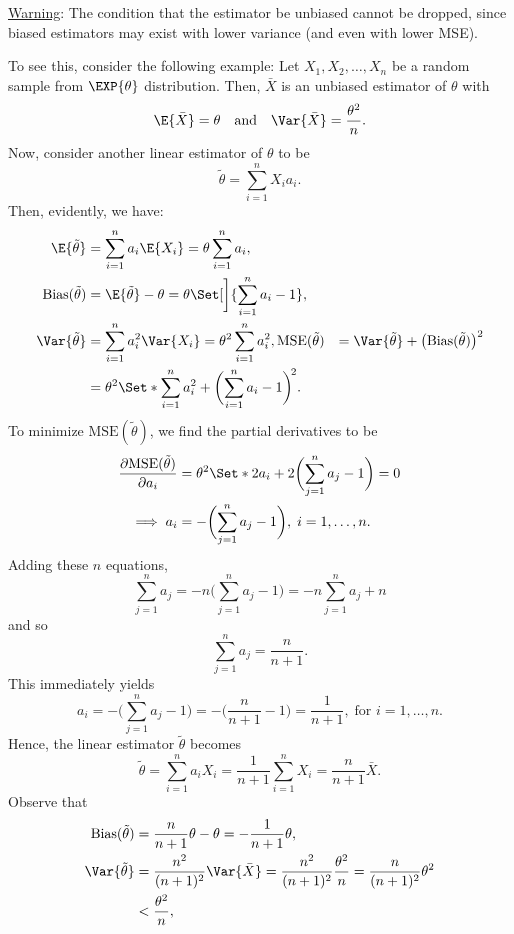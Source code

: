 \underline{Warning}: The condition that the estimator be unbiased
cannot be dropped, since biased estimators may exist
with lower variance (and even with lower MSE).

To see this, consider the following example: Let
$ X_1,X_2,\ldots,X_n $ be a random sample from $ \EXP{\theta} $
distribution. Then, $ \bar{X} $ is an unbiased estimator of $ \theta $
with
\[ \E{\bar{X}}=\theta\quad\text{and}\quad\Var{\bar{X}}=\frac{\theta^2}{n}. \]
Now, consider another linear estimator of $ \theta $ to be
\[ \tilde{\theta}=\sum_{i=1}^{n}X_i a_i. \]
Then, evidently, we have:
\begin{align*}
    \E{\tilde{\theta}}          & =\sum_{i=1}^{n}a_i\E{X_i}=\theta\sum_{i=1}^{n}a_i,                           \\
    \text{Bias}(\tilde{\theta}) & =\E{\tilde{\theta}}-\theta=\theta\Set[\bigg]{\sum_{i=1}^{n}a_i-1},           \\
    \Var{\tilde{\theta}}        & =\sum_{i=1}^{n}a_i^2\Var{X_i}=\theta^2 \sum_{i=1}^{n}a_i^2,
    \text{MSE}(\tilde{\theta})  & =\Var{\tilde{\theta}}+\bigl(\text{Bias}(\tilde{\theta})\bigr)^2              \\
                                & =\theta^2\Set*{\sum_{i=1}^{n}a_i^2+\biggl(\sum_{i=1}^{n}a_i-1\biggr)^{\!2}}.
\end{align*}
To minimize $ \text{MSE}(\tilde{\theta}) $, we find the partial derivatives to be
\begin{align*}
    \pdv{\text{MSE}(\tilde{\theta})}{a_i}
                 & =\theta^2\Set*{2 a_i+2\biggl(\sum_{j=1}^{n}a_j-1\biggr)}=0 \\
    \implies a_i & =-\biggl(\sum_{j=1}^{n}a_j-1\biggr),\; i=1,\ldots,n.
\end{align*}
Adding these $ n $ equations,
\[ \sum_{j=1}^{n}a_j=-n\biggl(\sum_{j=1}^{n}a_j-1\biggr)=-n \sum_{j=1}^{n}a_j+n \]
and so
\[ \sum_{j=1}^{n}a_j=\frac{n}{n+1}. \]
This immediately yields
\[ a_i=-\biggl(\sum_{j=1}^{n}a_j-1\biggr)=-\biggl(\frac{n}{n+1}-1\biggr)=\frac{1}{n+1},\;\text{for }i=1,\ldots,n. \]
Hence, the linear estimator $ \tilde{\theta} $ becomes
\[ \tilde{\theta}=\sum_{i=1}^{n}a_i X_i=\frac{1}{n+1}\sum_{i=1}^{n}X_i=\frac{n}{n+1}\bar{X}. \]
Observe that
\begin{align*}
    \text{Bias}(\tilde{\theta}) & =\frac{n}{n+1}\theta-\theta=-\frac{1}{n+1}\theta,                                                 \\
    \Var{\tilde{\theta}}        & =\frac{n^2}{(n+1)^2}\Var{\bar{X}}=\frac{n^2}{(n+1)^2}\frac{\theta^2}{n}=\frac{n}{(n+1)^2}\theta^2 \\
                                & <\frac{\theta^2}{n},
\end{align*}
